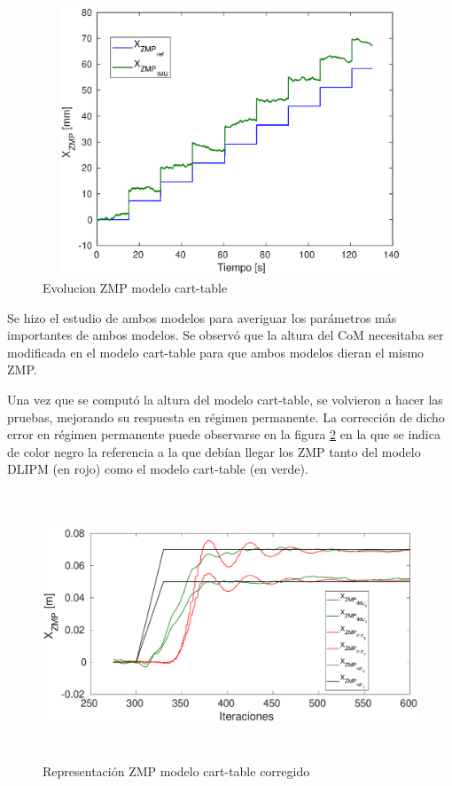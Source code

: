 \begin{figure}[H]
\centering
\includegraphics[width=13cm, height=8cm]{imagenes/apartado_5/test6_imu}
\caption{Evolucion ZMP modelo cart-table}
\label{figura515}
\end{figure}

Se hizo el estudio de ambos modelos para averiguar los parámetros más importantes de ambos modelos. Se observó que la altura del CoM necesitaba ser modificada en el modelo cart-table para que ambos modelos dieran el mismo ZMP.

Una vez que se computó la altura del modelo cart-table, se volvieron a hacer las pruebas, mejorando su respuesta en régimen permanente. La corrección de dicho error en régimen permanente puede observarse en la figura \ref{figura516} en la que se indica de color negro la referencia a la que debían llegar los ZMP tanto del modelo DLIPM (en rojo) como el modelo cart-table (en verde).

\begin{figure}[H]
\centering
\includegraphics[width=13cm, height=8cm]{imagenes/apartado_5/test_allcsv4_2}
\caption{Representación ZMP modelo cart-table corregido}
\label{figura516}
\end{figure}



\afterpage{\null\newpage}
\newpage
